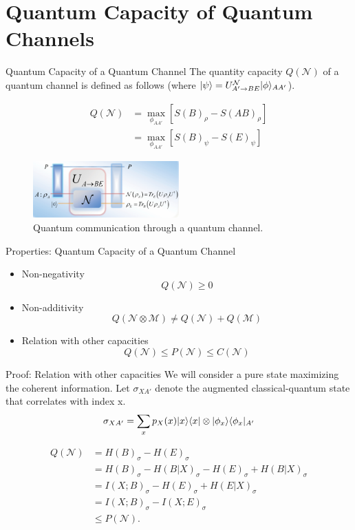 \section{Quantum Capacity of Quantum Channels}

\begin{frame}{Quantum Capacity of a Quantum Channel}
The quantity capacity $Q(\mathcal{N})$ of a quantum channel is defined as follows (where $\lvert\psi\rangle = U^{\mathcal{N}}_{A' \rightarrow BE} \lvert\phi\rangle_{AA'}$).
\begin{tcolorbox}
\begin{align*}
Q(\mathcal{N}) &= \max_{\phi_{AA'}} \left[ S(B)_\rho - S(AB)_\rho \right] \\
&= \max_{\phi_{AA'}} \left[ S(B)_\psi - S(E)_\psi \right]
\end{align*}
\end{tcolorbox}

\begin{figure}
    \includegraphics[width=0.5\textwidth]{figures/quantum_communication_quantum_channel.png}
    \caption{Quantum communication through a quantum channel.}
\end{figure}
\end{frame}

\begin{frame}{Properties: Quantum Capacity of a Quantum Channel}
\begin{itemize}
    \setlength{\itemsep}{1.5em}
    \item Non-negativity
    $$Q(\mathcal{N}) \geq 0$$
    \item Non-additivity
    $$Q(\mathcal{N} \otimes \mathcal{M}) \neq Q(\mathcal{N}) + Q(\mathcal{M})$$
    \item Relation with other capacities
    $$Q(\mathcal{N}) \leq P(\mathcal{N}) \leq C(\mathcal{N})$$
\end{itemize}
\end{frame}

\begin{frame}{Proof: Relation with other capacities}
We will consider a pure state maximizing the coherent information. Let $\sigma_{XA'}$ denote the augmented classical-quantum state that correlates with index x.
$$\sigma_{XA'} = \sum_{x} p_X(x) \lvert x\rangle\langle x\rvert \otimes \lvert\phi_x\rangle\langle\phi_x\rvert_{A'}$$

\begin{align*}
Q(\mathcal{N}) &= H(B)_{\sigma} - H(E)_{\sigma}\\
&= H(B)_{\sigma} - H(B|X)_{\sigma} - H(E)_{\sigma} + H(B|X)_{\sigma}\\
&= I(X;B)_{\sigma} - H(E)_{\sigma} + H(E|X)_{\sigma}\\
&= I(X;B)_{\sigma} - I(X;E)_{\sigma}\\
&\le P(\mathcal{N}).
\end{align*}
\end{frame}
